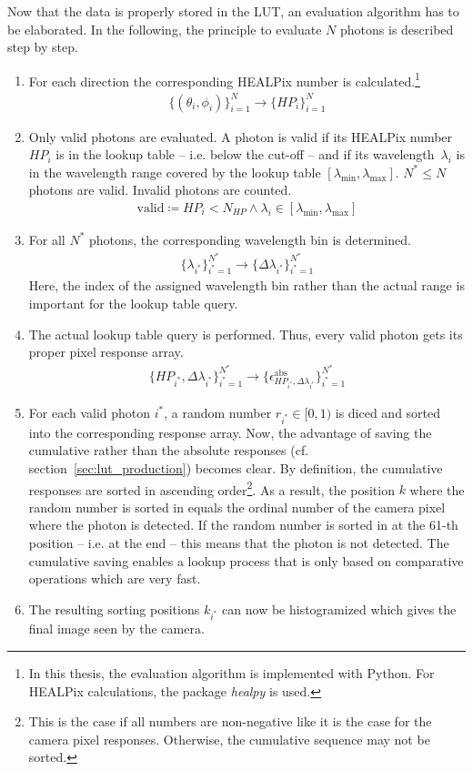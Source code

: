Now that the data is properly stored in the LUT, an evaluation algorithm has to be elaborated. In the following, the principle to evaluate $N$ photons is described step by step.

\begin{enumerate}
	\item For each direction the corresponding HEALPix number is calculated.\footnote{In this thesis, the evaluation algorithm is implemented with Python. For HEALPix calculations, the package \textit{healpy} is used.}
	\begin{align}
		\{(\theta_i, \phi_i)\}_{i=1}^N \rightarrow \{HP_i\}_{i=1}^N
	\end{align}
	\item Only valid photons are evaluated. A photon is valid if its HEALPix number~$HP_i$ is in the lookup table -- i.e. below the cut-off -- and if its wavelength~$\lambda_i$ is in the wavelength range covered by the lookup table $[\lambda_\text{min},\lambda_\text{max}]$. $N^\ast\leq N$ photons are valid. Invalid photons are counted.
	\begin{align}
		\text{valid} \coloneqq HP_i < N_{HP} \wedge \lambda_i \in [\lambda_\text{min},\lambda_\text{max}]
	\end{align} 
	\item For all $N^\ast$ photons, the corresponding wavelength bin is determined.
	\begin{align}
		\{\lambda_{i^\ast}\}_{i^\ast=1}^{N^\ast} \rightarrow \{ \Delta\lambda_{i^\ast} \}_{i^\ast=1}^{N^\ast}
	\end{align}
	Here, the index of the assigned wavelength bin rather than the actual range is important for the lookup table query.
	\item The actual lookup table query is performed. Thus, every valid photon gets its proper pixel response array.
	\begin{align}
		\{HP_{i^\ast}, \Delta\lambda_{i^\ast}\}_{i^\ast=1}^{N^\ast} \rightarrow \{ \epsilon^\text{abs}_{HP_{i^\ast},\Delta\lambda_{i^\ast}}\}_{i^\ast=1}^{N^\ast}
	\end{align}
	\item For each valid photon $i^\ast$, a random number $r_{i^\ast}\in[0,1)$ is diced and sorted into the corresponding response array. Now, the advantage of saving the cumulative rather than the absolute responses (cf. section~\ref{sec:lut_production}) becomes clear. By definition, the cumulative responses are sorted in ascending order\footnote{This is the case if all numbers are non-negative like it is the case for the camera pixel responses. Otherwise, the cumulative sequence may not be sorted.}. As a result, the position $k$ where the random number is sorted in equals the ordinal number of the camera pixel where the photon is detected. If the random number is sorted in at the \mbox{\num{61}-th} position -- i.e. at the end -- this means that the photon is not detected. The cumulative saving enables a lookup process that is only based on comparative operations which are very fast.
	\item The resulting sorting positions $k_{i^\ast}$ can now be histogramized which gives the final image seen by the camera.
\end{enumerate}
\newpage
